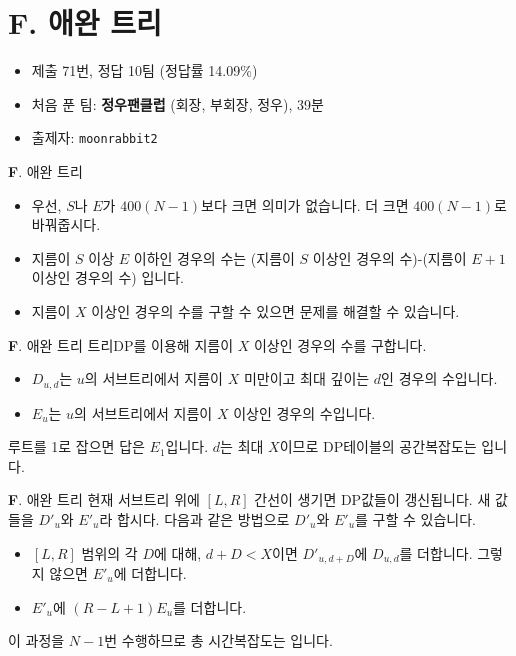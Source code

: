\section{F. 애완 트리}

\begin{frame} %
    \begin{itemize}
        \item 제출 71번, 정답 10팀 (정답률 14.09\%)
        \item 처음 푼 팀: \textbf{정우팬클럽} (회장, 부회장, 정우), 39분
        \item 출제자: \texttt{moonrabbit2}
    \end{itemize}
\end{frame}

\begin{frame}{\textbf{F}. 애완 트리}
    \begin{itemize}
        \item 우선, $S$나 $E$가 $400(N-1)$보다 크면 의미가 없습니다. 더 크면 $400(N-1)$로 바꿔줍시다.
        \item 지름이 $S$ 이상 $E$ 이하인 경우의 수는 (지름이 $S$ 이상인 경우의 수)-(지름이 $E+1$ 이상인 경우의 수) 입니다.
        \item 지름이 $X$ 이상인 경우의 수를 구할 수 있으면 문제를 해결할 수 있습니다.
    \end{itemize}
\end{frame}

\begin{frame}{\textbf{F}. 애완 트리}
    트리DP를 이용해 지름이 $X$ 이상인 경우의 수를 구합니다.
    \begin{itemize}
        \item $D_{u,d}$는 $u$의 서브트리에서 지름이 $X$ 미만이고 최대 깊이는 $d$인 경우의 수입니다.
        \item $E_u$는 $u$의 서브트리에서 지름이 $X$ 이상인 경우의 수입니다.
    \end{itemize}
    루트를 1로 잡으면 답은 $E_1$입니다. $d$는 최대 $X$이므로 DP테이블의 공간복잡도는 입니다.
\end{frame}

\begin{frame}{\textbf{F}. 애완 트리}
    현재 서브트리 위에 $[L,R]$ 간선이 생기면 DP값들이 갱신됩니다. 새 값들을 $D'_u$와 $E'_u$라 합시다. 다음과 같은 방법으로 $D'_u$와 $E'_u$를 구할 수 있습니다.
    \begin{itemize}
        \item $[L,R]$ 범위의 각 $D$에 대해, $d+D<X$이면 $D'_{u,d+D}$에 $D_{u,d}$를 더합니다. 그렇지 않으면 $E'_u$에 더합니다.
        \item $E'_u$에 $(R-L+1)E_u$를 더합니다.
    \end{itemize}
    이 과정을 $N-1$번 수행하므로 총 시간복잡도는 입니다.
\end{frame}


